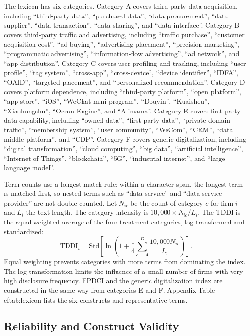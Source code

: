The lexicon has six categories. Category A covers third-party data acquisition, including ``third-party data'', ``purchased data'', ``data procurement'', ``data supplier'', ``data transaction'', ``data sharing'', and ``data interface''. Category B covers third-party traffic and advertising, including ``traffic purchase'', ``customer acquisition cost'', ``ad buying'', ``advertising placement'', ``precision marketing'', ``programmatic advertising'', ``information-flow advertising'', ``ad network'', and ``app distribution''. Category C covers user profiling and tracking, including ``user profile'', ``tag system'', ``cross-app'', ``cross-device'', ``device identifier'', ``IDFA'', ``OAID'', ``targeted placement'', and ``personalized recommendation''. Category D covers platform dependence, including ``third-party platform'', ``open platform'', ``app store'', ``iOS'', ``WeChat mini-program'', ``Douyin'', ``Kuaishou'', ``Xiaohongshu'', ``Ocean Engine'', and ``Alimama''. Category E covers first-party data capability, including ``owned data'', ``first-party data'', ``private-domain traffic'', ``membership system'', ``user community'', ``WeCom'', ``CRM'', ``data middle platform'', and ``CDP''. Category F covers generic digitalization, including ``digital transformation'', ``cloud computing'', ``big data'', ``artificial intelligence'', ``Internet of Things'', ``blockchain'', ``5G'', ``industrial internet'', and ``large language model''.

Term counts use a longest-match rule: within a character span, the longest term is matched first, so nested terms such as ``data service'' and ``data service provider'' are not double counted. Let $N_{ic}$ be the count of category $c$ for firm $i$ and $L_i$ the text length. The category intensity is $10{,}000\times N_{ic}/L_i$. The TDDI is the equal-weighted average of the four treatment categories, log-transformed and standardized:
\begin{equation}
\text{TDDI}_i=\text{Std}\left[\ln\left(1+\frac{1}{4}\sum_{c=A}^{D}\frac{10{,}000N_{ic}}{L_i}\right)\right].
\label{eq:tddi}
\end{equation}
Equal weighting prevents categories with more terms from dominating the index. The log transformation limits the influence of a small number of firms with very high disclosure frequency. FPDCI and the generic digitalization index are constructed in the same way from categories E and F. Appendix Table 
ef{tab:lexicon} lists the six constructs and representative terms.

\subsection{Reliability and Construct Validity}

